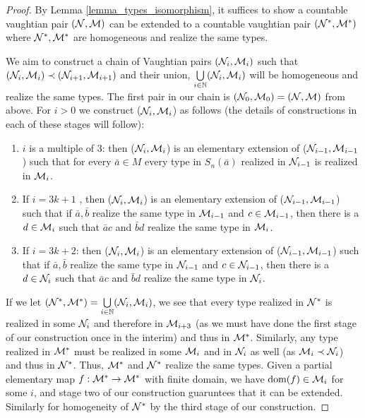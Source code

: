 \begin{proof}
By Lemma \ref{lemma_types_isomorphism}, it suffices to show a countable vaughtian pair \((\mathcal{N}, \mathcal{M})\) can be extended to a countable vaughtian pair \((\mathcal{N}^*, \mathcal{M}^*)\) where \(\mathcal{N}^*, \mathcal{M}^*\) are homogeneous and realize the same types. 

We aim to construct a chain of Vaughtian pairs \((\mathcal{N}_i, \mathcal{M}_i)\) such that \((\mathcal{N}_i, \mathcal{M}_i) \prec (\mathcal{N}_{i+1}, \mathcal{M}_{i+1})\) and their union, \(\bigcup\limits_{i\in \mathbb{N}} (\mathcal{N}_i, \mathcal{M}_i)\) will be homogeneous and realize the same types. 
The first pair in our chain is \((\mathcal{N}_0, \mathcal{M}_0) = (\mathcal{N}, \mathcal{M})\) from above. 
For \(i > 0\) we construct (\(\mathcal{N}_i, \mathcal{M}_i\)) as follows (the details of constructions in each of these stages will follow):

\begin{enumerate}

  \item  \(i\) is a multiple of 3: then (\(\mathcal{N}_i, \mathcal{M}_i\)) is an elementary extension of (\(\mathcal{N}_{i-1}, \mathcal{M}_{i-1}\)) such that for every \(\bar{a} \in M\) every type in \(S_n(\bar{a})\) realized in \(\mathcal{N}_{i-1}\) is realized in \(\mathcal{M}_i\).

  \item  If \(i = 3k+1\) , then (\(\mathcal{N}_i, \mathcal{M}_i\)) is an elementary extension of (\(\mathcal{N}_{i-1}, \mathcal{M}_{i-1}\)) such that if \(\bar{a}, \bar{b}\) realize the same type in \(\mathcal{M}_{i-1}\) and \(c \in \mathcal{M}_{i-1}\), then there is a \(d \in \mathcal{M}_i\) such that \(\bar{a}c\) and \(\bar{b}d\) realize the same type in \(\mathcal{M}_i\). 

  \item If \(i = 3k + 2\): then (\(\mathcal{N}_i, \mathcal{M}_i\)) is an elementary extension of (\(\mathcal{N}_{i-1}, \mathcal{M}_{i-1}\)) such that if \(\bar{a}, \bar{b}\) realize the same type in \(\mathcal{N}_{i-1}\) and \(c \in \mathcal{N}_{i-1}\), then there is a \(d \in \mathcal{N}_i\) such that \(\bar{a}c\) and \(\bar{b}d\) realize the same type in \(\mathcal{N}_i\).

\end{enumerate}

If we let \((\mathcal{N}^*, \mathcal{M}^*) = \bigcup\limits_{i \in \mathbb{N}}(\mathcal{N}_i, \mathcal{M}_i)\), we see that every type realized in \(\mathcal{N}^*\) is realized in some \(\mathcal{N}_i\) and therefore in \(\mathcal{M}_{i+3}\) (as we must have done the first stage of our construction once in the interim) and thus in \(\mathcal{M}^*\). 
Similarly, any type realized in \(\mathcal{M}^*\) must be realized in some \(\mathcal{M}_i\) and in \(\mathcal{N}_i\) as well (as \(\mathcal{M}_i \prec \mathcal{N}_i\)) and thus in \(\mathcal{N}^*\).
Thus, \(\mathcal{M}^*\) and  \(\mathcal{N}^*\) realize the same types.  
Given a partial elementary map \(f:\mathcal{M}^* \to \mathcal{M}^*\) with finite domain, we have \(\text{dom}(f) \in \mathcal{M}_i\) for some \(i\), and stage two of our construction guaruntees that it can be extended. 
Similarly for homogeneity of \(\mathcal{N}^*\) by the third stage of our construction. 


\end{proof}
